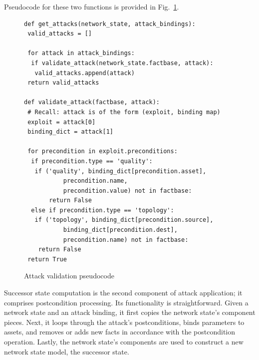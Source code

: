 Pseudocode for these two functions is provided in Fig.~\ref{fig:get_attacks_pc}.

\begin{figure}
\begin{lstlisting}
def get_attacks(network_state, attack_bindings):
 valid_attacks = []
 
 for attack in attack_bindings:
  if validate_attack(network_state.factbase, attack):
   valid_attacks.append(attack)
 return valid_attacks

def validate_attack(factbase, attack):
 # Recall: attack is of the form (exploit, binding map)
 exploit = attack[0]
 binding_dict = attack[1]
 
 for precondition in exploit.preconditions:
  if precondition.type == 'quality':
   if ('quality', binding_dict[precondition.asset], 
           precondition.name, 
           precondition.value) not in factbase:
       return False
  else if precondition.type == 'topology':
   if ('topology', binding_dict[precondition.source], 
           binding_dict[precondition.dest],
           precondition.name) not in factbase:
    return False
 return True
\end{lstlisting}
\label{fig:get_attacks_pc}
\caption{Attack validation pseudocode}
\end{figure}
Successor state computation is the second component of attack application;
it comprises postcondition processing. Its functionality is straightforward.
Given a network state and an attack binding, it first copies the network state's
component pieces. Next, it loops through the attack's
postconditions, binds parameters to assets, and removes or adds new facts
in accordance with the postcondition operation. Lastly, the network state's
components are used to construct a new network state model, the successor
state.

